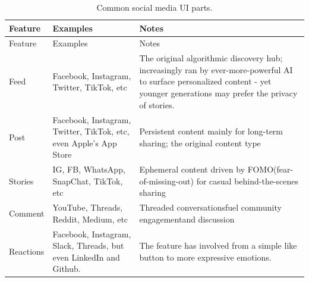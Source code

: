 \documentclass[
  letterpaper,
  DIV=11,
  numbers=noendperiod]{scrartcl}
\begin{document}
\begin{longtable}[]{@{}
  >{\raggedright\arraybackslash}p{}
  >{\raggedright\arraybackslash}p{}
  >{\raggedright\arraybackslash}p{}@{}}
\caption{Common social media UI parts.}\tabularnewline
\toprule\noalign{}
\begin{minipage}[b]{\linewidth}\raggedright
Feature
\end{minipage} & \begin{minipage}[b]{\linewidth}\raggedright
Examples
\end{minipage} & \begin{minipage}[b]{\linewidth}\raggedright
Notes
\end{minipage} \\
\midrule\noalign{}
\endfirsthead
\toprule\noalign{}
\begin{minipage}[b]{\linewidth}\raggedright
Feature
\end{minipage} & \begin{minipage}[b]{\linewidth}\raggedright
Examples
\end{minipage} & \begin{minipage}[b]{\linewidth}\raggedright
Notes
\end{minipage} \\
\midrule\noalign{}
\endhead
\bottomrule\noalign{}
\endlastfoot
Feed & Facebook, Instagram, Twitter, TikTok, etc & The original
algorithmic discovery hub; increasingly ran by ever-more-powerful AI to
surface personalized content - yet younger generations may prefer the
privacy of stories. \\
Post & Facebook, Instagram, Twitter, TikTok, etc, even Apple's App Store
& Persistent content mainly for long-term sharing; the original content
type \\
Stories & IG, FB, WhatsApp, SnapChat, TikTok, etc & Ephemeral content
driven by FOMO(fear-of-missing-out) for casual behind-the-scenes
sharing \\
Comment & YouTube, Threads, Reddit, Medium, etc & Threaded
conversationsfuel community engagementand discussion \\
Reactions & Facebook, Instagram, Slack, Threads, but even LinkedIn and
Github. & The feature has involved from a simple like button to more
expressive emotions. \\
\end{longtable}
\end{document}
